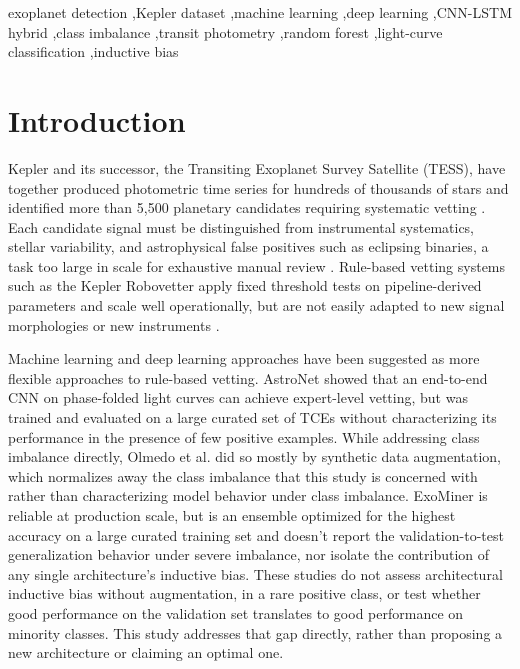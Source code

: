 \documentclass[preprint,11pt,times]{elsarticle}
\begin{document}
\begin{frontmatter}
\begin{keyword}
exoplanet detection \sep Kepler dataset \sep machine learning \sep deep learning \sep CNN-LSTM hybrid \sep class imbalance \sep transit photometry \sep random forest \sep light-curve classification \sep inductive bias
\end{keyword}

\end{frontmatter}

\section{Introduction}\label{sec1}

Kepler and its successor, the Transiting Exoplanet Survey Satellite (TESS), have together produced photometric time series for hundreds of thousands of stars and identified more than 5,500 planetary candidates requiring systematic vetting \cite{bib1,bib2}. Each candidate signal must be distinguished from instrumental systematics, stellar variability, and astrophysical false positives such as eclipsing binaries, a task too large in scale for exhaustive manual review \cite{bib1}. Rule-based vetting systems such as the Kepler Robovetter apply fixed threshold tests on pipeline-derived parameters and scale well operationally, but are not easily adapted to new signal morphologies or new instruments \cite{bib5}.

Machine learning and deep learning approaches have been suggested as more flexible approaches to rule-based vetting. AstroNet \cite{bib6} showed that an end-to-end CNN on phase-folded light curves can achieve expert-level vetting, but was trained and evaluated on a large curated set of TCEs without characterizing its performance in the presence of few positive examples. While addressing class imbalance directly, Olmedo et al. \cite{bib7} did so mostly by synthetic data augmentation, which normalizes away the class imbalance that this study is concerned with rather than characterizing model behavior under class imbalance. ExoMiner \cite{bib14} is reliable at production scale, but is an ensemble optimized for the highest accuracy on a large curated training set and doesn't report the validation-to-test generalization behavior under severe imbalance, nor isolate the contribution of any single architecture's inductive bias. These studies do not assess architectural inductive bias without augmentation, in a rare positive class, or test whether good performance on the validation set translates to good performance on minority classes. This study addresses that gap directly, rather than proposing a new architecture or claiming an optimal one.
\end{document}
